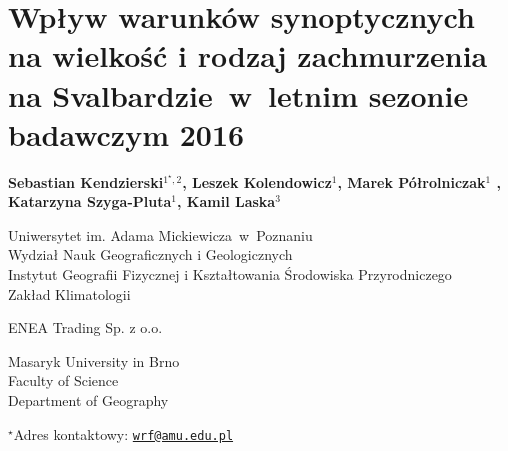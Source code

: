 \documentclass[\main/boa.tex]{subfiles}
\begin{document}
\sloppy


\section{Wpływ warunków synoptycznych na wielkość i rodzaj zachmurzenia na Svalbardzie~w~letnim sezonie badawczym 2016}

\begin{center}
  {\bf  {} Sebastian Kendzierski$^{1^\star,2}$,  Leszek Kolendowicz$^{1}$,  Marek Półrolniczak$^{1}$ ,  Katarzyna Szyga-Pluta$^{1}$,   Kamil Laska$^{3}$}
\end{center}

\vskip 0.3cm

\begin{affiliations}
\begin{enumerate}
\begin{minipage}{0.915\textwidth}
\centering
\item Uniwersytet im. Adama Mickiewicza~w~Poznaniu \\ Wydział Nauk Geograficznych i Geologicznych  \\ Instytut Geografii Fizycznej i Kształtowania Środowiska Przyrodniczego\\
Zakład Klimatologii \\[-2pt]
\item ENEA Trading Sp. z o.o.
\item Masaryk University in Brno \\ Faculty of Science\\ Department of Geography
\end{minipage}
\end{enumerate}
$^\star$Adres kontaktowy: \href{mailto:wrf@amu.edu.pl}{\nolinkurl{wrf@amu.edu.pl}}\\
\end{affiliations}

\vskip 0.5cm


\vskip 0.5cm
\end{document}
